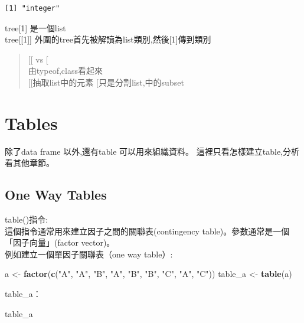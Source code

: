 \documentclass[]{book}
\newenvironment{Shaded}{\begin{snugshade}}{\end{snugshade}}
\newcommand{\KeywordTok}[1]{\textcolor[rgb]{0.13,0.29,0.53}{\textbf{#1}}}
\newcommand{\NormalTok}[1]{#1}
\newcommand{\StringTok}[1]{\textcolor[rgb]{0.31,0.60,0.02}{#1}}
\theoremstyle{definition}
\theoremstyle{definition}
\theoremstyle{definition}
\theoremstyle{remark}
\begin{document}
\begin{verbatim}
[1] "integer"
\end{verbatim}

tree{[}1{]} 是一個list\\
tree{[}{[}1{]}{]}
外圍的tree\protect\hyperlink{section-1}{}首先被解讀為list類別,然後{[}1{]}傳到類別

\begin{quote}
{[}{[} vs {[}\\
由typeof,class看起來\\
{[}{[}抽取list中的元素 {[}只是分割list,中的subset
\end{quote}

\hypertarget{tables}{%
\section{Tables}\label{tables}}

除了data frame 以外,還有table 可以用來組織資料。
這裡只看怎樣建立table,分析看其他章節。

\hypertarget{one-way-tables}{%
\subsection{One Way Tables}\label{one-way-tables}}

table()指令:\\
這個指令通常用來建立因子之間的關聯表(contingency
table)。參數通常是一個「因子向量」(factor vector)。\\
例如建立一個單因子關聯表（one way table）:

\begin{Shaded}
\begin{Highlighting}[]
\NormalTok{a <-}\StringTok{ }\KeywordTok{factor}\NormalTok{(}\KeywordTok{c}\NormalTok{(}\StringTok{"A"}\NormalTok{, }\StringTok{"A"}\NormalTok{, }\StringTok{"B"}\NormalTok{, }\StringTok{"A"}\NormalTok{, }\StringTok{"B"}\NormalTok{, }\StringTok{"B"}\NormalTok{, }\StringTok{"C"}\NormalTok{, }\StringTok{"A"}\NormalTok{, }\StringTok{"C"}\NormalTok{))}
\NormalTok{table_a <-}\StringTok{ }\KeywordTok{table}\NormalTok{(a)}
\end{Highlighting}
\end{Shaded}

table\_a：

\begin{Shaded}
\begin{Highlighting}[]
\NormalTok{table_a}
\end{Highlighting}
\end{Shaded}
\end{document}
